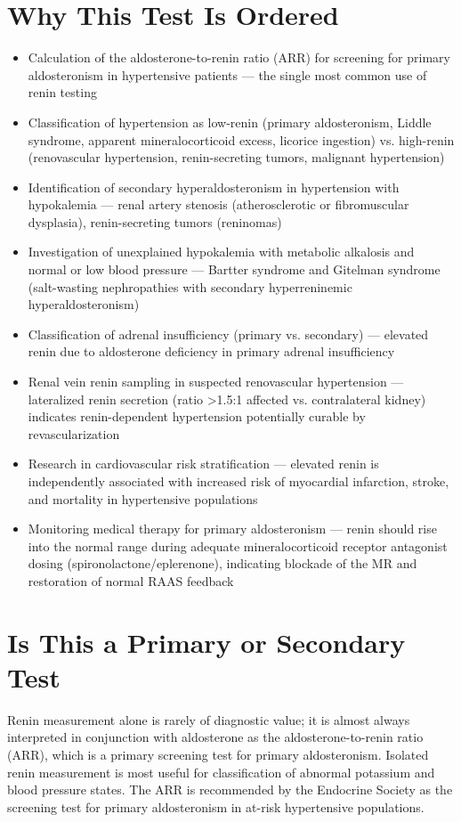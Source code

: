 \section*{Why This Test Is Ordered}
\begin{itemize}
  \item Calculation of the aldosterone-to-renin ratio (ARR) for screening for primary aldosteronism in hypertensive patients --- the single most common use of renin testing
  \item Classification of hypertension as low-renin (primary aldosteronism, Liddle syndrome, apparent mineralocorticoid excess, licorice ingestion) vs. high-renin (renovascular hypertension, renin-secreting tumors, malignant hypertension)
  \item Identification of secondary hyperaldosteronism in hypertension with hypokalemia --- renal artery stenosis (atherosclerotic or fibromuscular dysplasia), renin-secreting tumors (reninomas)
  \item Investigation of unexplained hypokalemia with metabolic alkalosis and normal or low blood pressure --- Bartter syndrome and Gitelman syndrome (salt-wasting nephropathies with secondary hyperreninemic hyperaldosteronism)
  \item Classification of adrenal insufficiency (primary vs. secondary) --- elevated renin due to aldosterone deficiency in primary adrenal insufficiency
  \item Renal vein renin sampling in suspected renovascular hypertension --- lateralized renin secretion (ratio >1.5:1 affected vs. contralateral kidney) indicates renin-dependent hypertension potentially curable by revascularization
  \item Research in cardiovascular risk stratification --- elevated renin is independently associated with increased risk of myocardial infarction, stroke, and mortality in hypertensive populations
  \item Monitoring medical therapy for primary aldosteronism --- renin should rise into the normal range during adequate mineralocorticoid receptor antagonist dosing (spironolactone/eplerenone), indicating blockade of the MR and restoration of normal RAAS feedback
\end{itemize}

\section*{Is This a Primary or Secondary Test}
Renin measurement alone is rarely of diagnostic value; it is almost always interpreted in conjunction with aldosterone as the aldosterone-to-renin ratio (ARR), which is a primary screening test for primary aldosteronism. Isolated renin measurement is most useful for classification of abnormal potassium and blood pressure states. The ARR is recommended by the Endocrine Society as the screening test for primary aldosteronism in at-risk hypertensive populations.

